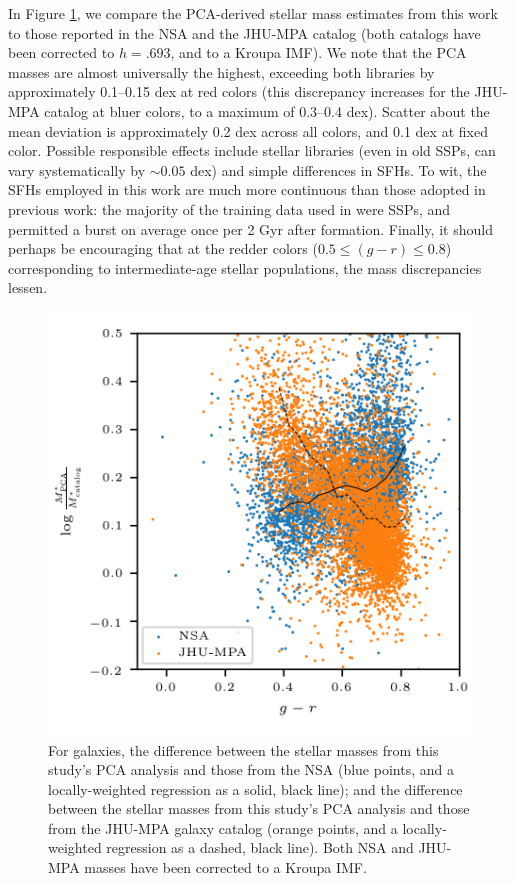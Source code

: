 In Figure \ref{fig:dMasses}, we compare the PCA-derived stellar mass estimates from this work to those reported in the NSA and the JHU-MPA catalog (both catalogs have been corrected to $h=.693$, and to a Kroupa IMF). We note that the PCA masses are almost universally the highest, exceeding both libraries by approximately 0.1--0.15 dex at red colors (this discrepancy increases for the JHU-MPA catalog at bluer colors, to a maximum of 0.3--0.4 dex). Scatter about the mean deviation is approximately 0.2 dex across all colors, and 0.1 dex at fixed color. Possible responsible effects include stellar libraries (even in old SSPs,  can vary systematically by $\sim 0.05$ dex) and simple differences in SFHs. To wit, the SFHs employed in this work are much more continuous than those adopted in previous work: the majority of the training data used in \citet{blanton_roweis_07} were SSPs, and \citet{kauffmann_heckman_white_03} permitted a burst on average once per 2 Gyr after formation. Finally, it should perhaps be encouraging that at the redder colors ($0.5 \le (g-r) \le 0.8$) corresponding to intermediate-age stellar populations, the mass discrepancies lessen.

\begin{figure}
    \centering
    \includegraphics[width=\columnwidth]{dMasses}
    \caption[Comparison between NSA catalog and PCA-derived total stellar masses]{\fixspacing For \nrungalaxies galaxies, the difference between the stellar masses from this study's PCA analysis and those from the NSA (blue points, and a locally-weighted regression as a solid, black line); and the difference between the stellar masses from this study's PCA analysis and those from the JHU-MPA galaxy catalog (orange points, and a locally-weighted regression as a dashed, black line). Both NSA and JHU-MPA masses have been corrected to a Kroupa IMF.}
    \label{fig:dMasses}
\end{figure}

